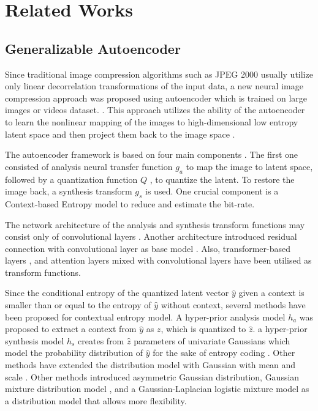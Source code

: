 \section{Related Works}
\subsection{Generalizable Autoencoder}\label{sec:Generalizable_Autoencoder}

Since traditional image compression algorithms such as JPEG 2000 usually utilize only linear decorrelation transformations of the input data, a new neural image compression approach was proposed using autoencoder which is trained on large images or videos dataset. \cite{jiangMLICLinearComplexity2024,jiangMLICMultiReferenceEntropy2024,heELICEfficientLearned2022,theisLossyImageCompression2017a}.  
This approach utilizes the ability of the autoencoder to learn the nonlinear mapping of the images to high-dimensional low entropy latent space and then project them back to the image space \cite{balleEndtoendOptimizedImage2017, balleVariationalImageCompression2018}.  

The autoencoder framework is based on four main components \cite{heELICEfficientLearned2022,jiangMLICLinearComplexity2024}. The first one consisted of analysis neural transfer function $g_a$ to map the image to latent space, followed by a quantization function $Q$ , to quantize the latent. To restore the image back, a synthesis transform $g_s$ is used. One crucial component is a Context-based Entropy model to reduce and estimate the bit-rate. 

The network architecture of the analysis and synthesis transform functions may consist only of convolutional layers \cite{liuComprehensiveBenchmarkSingle2020}. Another architecture introduced residual connection with convolutional layer as base model \cite{liuLearnedImageCompression2023}. Also, transformer-based layers \cite{luTransformerbasedImageCompression2021}, and attention layers mixed with convolutional layers \cite{chengLearnedImageCompression2020} have been utilised as transform functions. 

Since the conditional entropy of the quantized latent vector $\hat{y}$ given a context is smaller than or equal to the entropy of $\hat{y}$ without context, several methods have been proposed for contextual entropy model. A hyper-prior analysis model $h_{a}$ was proposed to extract a context from $\hat{y}$ as $z$, which is quantized to $\hat{z}$. a hyper-prior synthesis model $h_{s}$ creates from $\hat{z}$ parameters of univariate Gaussians which model the probability distribution of $\hat{y}$ for the sake of entropy coding \cite{balleVariationalImageCompression2018}. Other methods have extended the distribution model with Gaussian with mean and scale \cite{minnenJointAutoregressiveHierarchical2018}. Other methods introduced asymmetric Gaussian distribution, Gaussian mixture distribution model \cite{chengLearnedImageCompression2020}, and a Gaussian-Laplacian logistic mixture model \cite{fuLearnedImageCompression2023} as a distribution model that allows more flexibility. 

